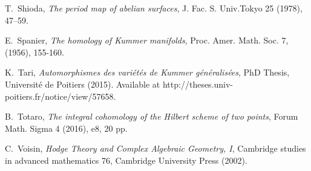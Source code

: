 \begin{thebibliography}{10}
T.~Shioda, \emph{The period map of abelian surfaces}, J. Fac. S. Univ.Tokyo 25 (1978), 47--59.

E.~Spanier, 
\emph{The homology of Kummer manifolds},
Proc. Amer. Math. Soc.
7, (1956), 155-160.

K.~Tari, 
\emph{Automorphismes des vari\'et\'es de Kummer g\'en\'eralis\'ees},
PhD Thesis, Universit\'e de Poitiers (2015).
Available at http://theses.univ-poitiers.fr/notice/view/57658.

B.~Totaro, \emph{The integral cohomology of the Hilbert scheme of two points}, 
Forum Math. Sigma 4 (2016), e8, 20 pp.

C.~Voisin, \emph{Hodge Theory and Complex Algebraic Geometry, I},
  Cambridge studies in advanced mathematics 76, Cambridge University Press (2002).

\end{thebibliography}
